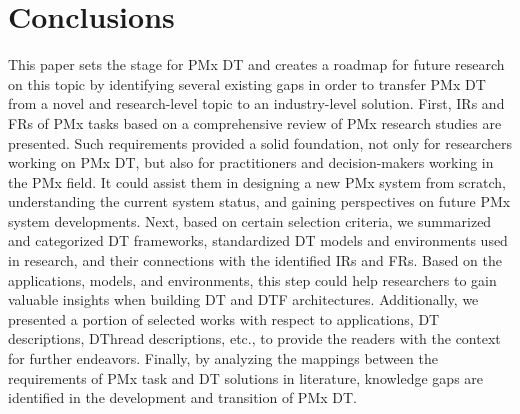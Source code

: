 \documentclass[runningheads]{llncs}
\begin{document}
\section{Conclusions}
\label{sec:Conclusions}
This paper sets the stage for PMx DT and creates a roadmap for future research on this topic by identifying several existing gaps in order to transfer PMx DT from a novel and research-level topic to an industry-level solution. First, IRs and FRs of PMx tasks based on a comprehensive review of PMx research studies are presented. Such requirements provided a solid foundation, not only for researchers working on PMx DT, but also for practitioners and decision-makers working in the PMx field. It could assist them in designing a new PMx system from scratch, understanding the current system status, and gaining perspectives on future PMx system developments. Next, based on certain selection criteria, we summarized and categorized DT frameworks, standardized DT models and environments used in research, and their connections with the identified IRs and FRs. Based on the applications, models, and environments, this step could help researchers to gain valuable insights when building DT and DTF architectures. Additionally, we presented a portion of selected works with respect to applications, DT descriptions, DThread descriptions, etc., to provide the readers with the context for further endeavors. Finally, by analyzing the mappings between the requirements of PMx task and DT solutions in literature, knowledge gaps are identified in the development and transition of PMx DT.



\end{document}
